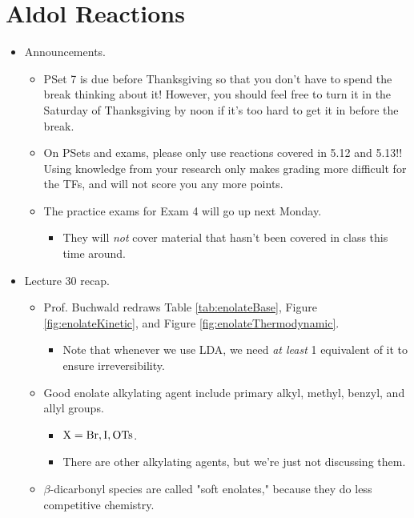 \documentclass[../notes.tex]{subfiles}
\begin{document}
\section{Aldol Reactions}
\begin{itemize}
    \item {}Announcements.
    \begin{itemize}
        \item PSet 7 is due before Thanksgiving so that you don't have to spend the break thinking about it! However, you should feel free to turn it in the Saturday of Thanksgiving by noon if it's too hard to get it in before the break.
        \item On PSets and exams, please only use reactions covered in 5.12 and 5.13!! Using knowledge from your research only makes grading more difficult for the TFs, and will not score you any more points.
        \item The practice exams for Exam 4 will go up next Monday.
        \begin{itemize}
            \item They will \emph{not} cover material that hasn't been covered in class this time around.
        \end{itemize}
    \end{itemize}
    \item Lecture 30 recap.
    \begin{itemize}
        \item Prof. Buchwald redraws Table \ref{tab:enolateBase}, Figure \ref{fig:enolateKinetic}, and Figure \ref{fig:enolateThermodynamic}.
        \begin{itemize}
            \item Note that whenever we use LDA, we need \emph{at least} 1 equivalent of it to ensure irreversibility.
        \end{itemize}
        \item Good enolate alkylating agent include primary alkyl, methyl, benzyl, and allyl groups.
        \begin{itemize}
            \item $\ce{X}=\ce{Br},\ce{I},\ce{OTs}$.
            \item There are other alkylating agents, but we're just not discussing them.
        \end{itemize}
        \item $\beta$-dicarbonyl species are called "soft enolates," because they do less competitive chemistry.
    \end{itemize}

\end{itemize}
\end{document}
